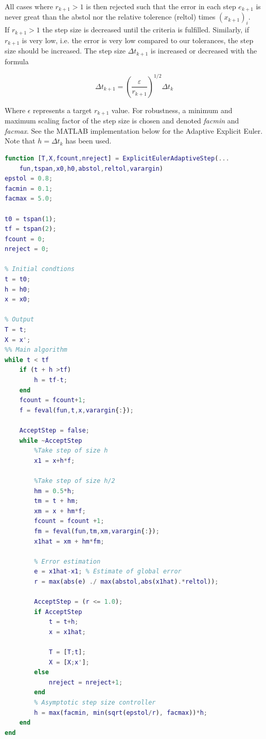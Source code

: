 All cases where $r_{k+1} > 1$ is then rejected such that the error in each step $e_{k+1}$ is never great than the abstol nor the relative tolerence (reltol) times $(x_{k+1})_i$. 
\\
If $r_{k+1} > 1$ the step size is decreased until the criteria is fulfilled. Similarly, if $r_{k+1}$ is very low, i.e. the error is very low compared to our tolerances, the step size should be increased.
The step size $\Delta t_{k+1}$ is increased or decreased with the formula

\begin{equation}
\Delta t_{k+1}=\left(\frac{\varepsilon}{r_{k+1}}\right)^{1 / 2} \Delta t_{k}
\end{equation}

Where $\epsilon$ represents a target $r_{k+1}$ value. For robustness, a minimum and maximum scaling factor of the step size is chosen and denoted \textit{facmin} and \textit{facmax}. See the MATLAB implementation below for the Adaptive Explicit Euler. Note that $h = \Delta t_{k}$ has been used.

\begin{adjustwidth*}{0cm}{-0.4cm}
\begin{lstlisting}[language=Matlab,caption=Explicit Euler (adaptive step size), label=ExplicitEulerFixie]
function [T,X,fcount,nreject] = ExplicitEulerAdaptiveStep(...
    fun,tspan,x0,h0,abstol,reltol,varargin)
epstol = 0.8;
facmin = 0.1;
facmax = 5.0;

t0 = tspan(1);
tf = tspan(2);
fcount = 0;
nreject = 0;

% Initial condtions
t = t0;
h = h0;
x = x0;

% Output
T = t;
X = x';
%% Main algorithm
while t < tf
    if (t + h >tf)
        h = tf-t;
    end
    fcount = fcount+1;
    f = feval(fun,t,x,varargin{:});

    AcceptStep = false;
    while ~AcceptStep
        %Take step of size h
        x1 = x+h*f;

        %Take step of size h/2
        hm = 0.5*h;
        tm = t + hm;
        xm = x + hm*f;
        fcount = fcount +1;
        fm = feval(fun,tm,xm,varargin{:});
        x1hat = xm + hm*fm;

        % Error estimation
        e = x1hat-x1; % Estimate of global error
        r = max(abs(e) ./ max(abstol,abs(x1hat).*reltol));

        AcceptStep = (r <= 1.0);
        if AcceptStep
            t = t+h;
            x = x1hat;

            T = [T;t];
            X = [X;x'];
        else
            nreject = nreject+1;
        end
        % Asymptotic step size controller
        h = max(facmin, min(sqrt(epstol/r), facmax))*h;
    end
end
\end{lstlisting}
\end{adjustwidth*}

